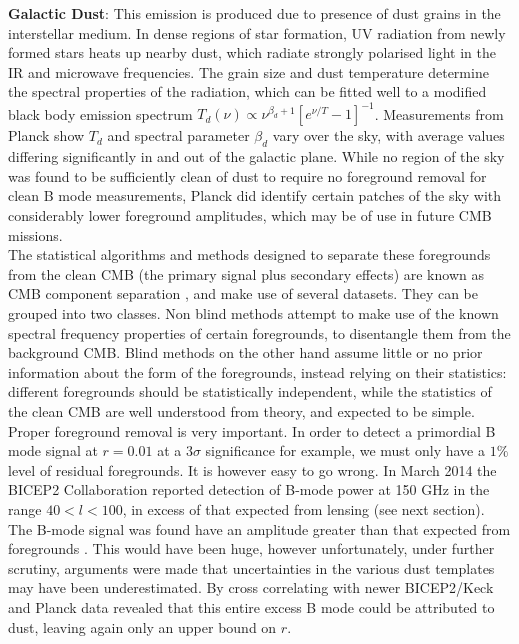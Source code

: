 \documentclass[a4paper,10pt]{article}
\begin{document}
\textbf{Galactic Dust}: This emission is produced due to presence of dust grains in the interstellar medium. In dense regions of star formation, UV radiation from newly formed stars heats up nearby dust, which radiate strongly polarised light in the IR and microwave frequencies. The grain size and dust temperature determine the spectral properties of the radiation, which can be fitted well to a modified black body emission spectrum $T_d(\nu) \propto \nu ^ {\beta_d+1}[e^{\nu/T}-1]^{-1}$. Measurements from Planck show $T_d$ and spectral parameter $\beta_d$ vary over the sky, with average values differing significantly in and out of the galactic plane. While no region of the sky was found to be sufficiently clean of dust to require no foreground removal for clean B mode measurements, Planck did identify certain patches of the sky with considerably lower foreground amplitudes, which may be of use in future CMB missions. \\

The statistical algorithms and methods designed to separate these foregrounds from the clean CMB (the primary signal plus secondary effects) are known as CMB component separation \cite{componentsep}, and make use of several datasets. They can be grouped into two classes. Non blind methods attempt to make use of the known spectral frequency properties of certain foregrounds, to disentangle them from the background CMB. Blind methods on the other hand assume little or no prior information about the form of the foregrounds, instead relying on their statistics: different foregrounds should be statistically independent, while the statistics of the clean CMB are well understood from theory, and expected to be simple.\\

Proper foreground removal is very important. In order to detect a primordial B mode signal at $r=0.01$ at a $3\sigma$ significance for example, we must only have a $1\%$ level of residual foregrounds. It is however easy to go wrong. In March 2014 the BICEP2 Collaboration reported detection of B-mode power at 150 GHz in the range $40<l<100$, in excess of that expected from lensing (see next section). The B-mode signal was found have an amplitude greater than that expected from foregrounds \cite{bicep2cockup}. This would have been huge, however unfortunately, under further scrutiny, arguments were made that uncertainties in the various dust templates may have been underestimated. By cross correlating with newer BICEP2/Keck and Planck data revealed that this entire excess B mode could be attributed to dust, leaving again only an upper bound on $r$.
\end{document}
